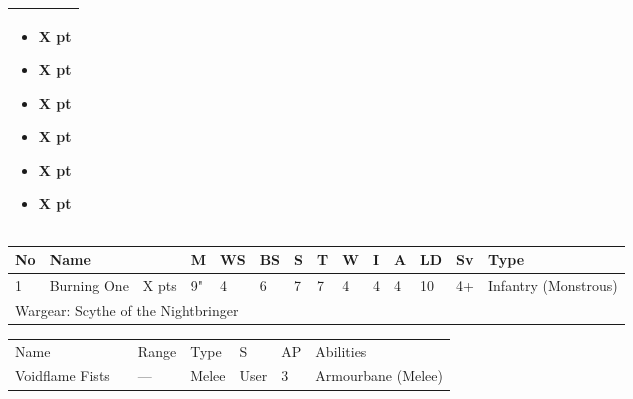 \begin{tabular}{||m{532pt}||}
\begin{itemize}
		\item \quickref{Seismic Assault} \hrulefill X pt
		\item \quickref{Sky of Falling Stars} \hrulefill X pt
		\item \quickref{Swarm of Spirit Dust} \hrulefill X pt
		\item \quickref{Time's Arrow} \hrulefill X pt
		\item \quickref{Transdimensional Thunderbolt} \hrulefill X pt
		\item \quickref{Withering Worldscape} \hrulefill X pt
	\end{itemize} \\
	\hline
\end{tabular}




\newpage
{}

\noindent
\begin{tabular}{||m{10pt} m{95pt} m{30pt} m{11pt} m{11pt} m{11pt} m{11pt} m{11pt} m{11pt} m{11pt} m{11pt} m{11pt} m{11pt} m{125pt}||}
	\hline
	No & Name & & M & WS & BS & S & T & W & I & A & LD & Sv & Type \\
	\hline
	1 & Burning One & X pts & 9" & 4 & 6 & 7 & 7 & 4 & 4 & 4 & 10 & 4+ & Infantry (Monstrous)\\
	\hline
	\hline
	\multicolumn{14}{||Z{532 pt}||}{Wargear: Scythe of the Nightbringer}\\
	\hline
\end{tabular}

\noindent
\begin{tabular}{||m{140pt} m{0pt} m{31pt} m{55pt} m{12pt} m{12pt} m{210pt}||}
	\hline
	Name & & Range & Type & S & AP & Abilities \\
	Voidflame Fists & & — & Melee & User & 3 & Armourbane (Melee) \\
	\hline	
	\hline
\end{tabular}


